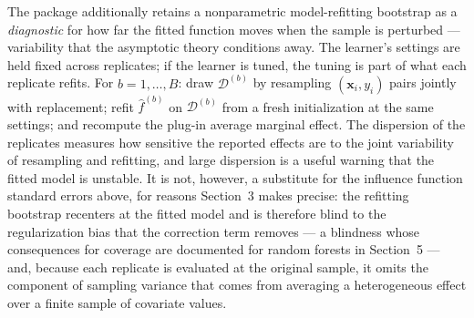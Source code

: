 \documentclass[12pt,a4paper]{article}
\numberwithin{equation}{section}
\theoremstyle{plain}
\theoremstyle{definition}
\begin{document}
	The package additionally retains a nonparametric model-refitting bootstrap
	\citep{efron1979, efrontibshirani1993} as a \emph{diagnostic} for how far the fitted function moves when the sample is perturbed --- variability that the asymptotic theory conditions away. The learner's settings are held fixed across replicates; if the learner is tuned, the tuning is part of what each replicate refits. For $b = 1, \dots, B$: draw
	$\mathcal{D}^{(b)}$ by resampling $(\mathbf{x}_i, y_i)$ pairs jointly with
	replacement; refit $\hat{f}^{(b)}$ on $\mathcal{D}^{(b)}$ from a fresh initialization at the same settings; and recompute the plug-in average
	marginal effect. The dispersion of the replicates measures how sensitive the reported effects are to the joint variability of resampling and refitting, and large dispersion is a useful warning that the
	fitted model is unstable. It is not, however, a substitute for the influence
	function standard errors above, for reasons Section~3 makes precise: the
	refitting bootstrap recenters at the fitted model and is therefore blind to the
	regularization bias that the correction term removes --- a blindness whose
	consequences for coverage are documented for random forests in Section~5 --- and,
	because each replicate is evaluated at the original sample, it omits the
	component of sampling variance that comes from averaging a heterogeneous effect
	over a finite sample of covariate values.
	
\end{document}
